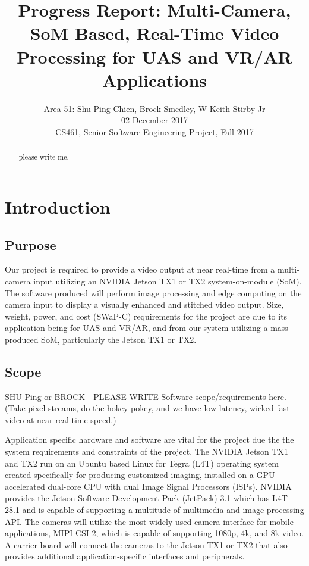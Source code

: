 \documentclass[letterpaper,10pt,serif,draftclsnofoot,onecolumn,compsoc,titlepage]{IEEEtran}
\title{Progress Report: Multi-Camera, SoM Based, Real-Time Video Processing for UAS and VR/AR Applications}
\author{Area 51: Shu-Ping Chien, Brock Smedley, W Keith Stirby Jr \\ 02 December 2017 \\ CS461, Senior Software Engineering Project, Fall 2017}
\begin{document}
\begin{titlepage}
\maketitle

\begin{abstract}

please write me. \\

\thispagestyle{empty}
\end{abstract}
\end{titlepage}

\newpage
\tableofcontents

\newpage

\section{Introduction}

\subsection{Purpose}

Our project is required to provide a video output at near real-time from a 
multi-camera input utilizing an NVIDIA Jetson TX1 or TX2 system-on-module (SoM). 
The software produced will perform image processing and edge computing on the 
camera input to display a visually enhanced and stitched video output. 
Size, weight, power, and cost (SWaP-C) requirements for the project are due 
to its application being for UAS and VR/AR, and from our system utilizing a 
mass-produced SoM, particularly the Jetson TX1 or TX2.  

\subsection{Scope}
 
SHU-Ping or BROCK - PLEASE WRITE
Software scope/requirements here. (Take pixel streams, do the 
hokey pokey, and we have low latency, wicked fast video at near real-time speed.)
 
Application specific hardware and software are vital for the project due the the 
system requirements and constraints of the project.
The NVIDIA Jetson TX1 and TX2 run on an Ubuntu based Linux for Tegra (L4T) operating 
system created specifically for producing customized imaging, installed on a 
GPU-accelerated dual-core CPU with dual Image Signal Processors (ISPs). 
NVIDIA provides the Jetson Software Development Pack (JetPack) 3.1 which has L4T 28.1 
and is capable of supporting a multitude of multimedia and image processing API. 
The cameras will utilize the most widely used camera interface for mobile applications, 
MIPI CSI-2, which is capable of supporting 1080p, 4k, and 8k video. 
A carrier board will connect the cameras to the Jetson TX1 or TX2 that also provides 
additional application-specific interfaces and peripherals. 
\end{document}
